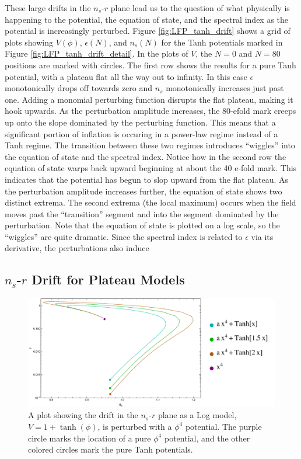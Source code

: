 \documentclass[a4paper,11pt]{article}
\def\nsr{$n_s$-$r$ }
\begin{document}
These large drifts in the \nsr plane lead us to the question of what physically is happening to the potential, the equation of state, and the spectral index as the potential is increasingly perturbed. Figure \ref{fig:LFP_tanh_drift} shows a grid of plots showing $V(\phi)$, $\epsilon(N)$, and $n_s(N)$ for the Tanh potentials marked in Figure \ref{fig:LFP_tanh_drift_detail}. In the plots of $V$, the $N=0$ and $N=80$ positions are marked with circles. The first row shows the results for a pure Tanh potential, with a plateau flat all the way out to infinity. In this case $\epsilon$ monotonically drops off towards zero and $n_s$ monotonically increases just past one. Adding a monomial perturbing function disrupts the flat plateau, making it hook upwards. As the perturbation amplitude increases, the 80-efold mark creeps up onto the slope dominated by the perturbing function. This means that a significant portion of inflation is occuring in a power-law regime instead of a Tanh regime. The transition between these two regimes introduces ``wiggles'' into the equation of state and the spectral index. Notice how in the second row the equation of state warps back upward beginning at about the 40 e-fold mark. This indicates that the potential has begun to slop upward from the flat plateau. As the perturbation amplitude increases further, the equation of state shows two distinct extrema. The second extrema (the local maximum) occurs when the field moves past the ``transition'' segment and into the segment dominated by the perturbation. Note that the equation of state is plotted on a log scale, so the ``wiggles'' are quite dramatic. Since the spectral index is related to $\epsilon$ via its derivative, the perturbations also induce 


\subsection{\nsr Drift for Plateau Models}
\label{ssec:DriftResults}

\begin{figure}[h!]
	\centering
	\includegraphics[width=\textwidth]{figures/LFP_lines_Tanh_final.pdf}
	\caption[Drift in \nsr plane for Tanh model with perturbations.]{A plot showing the drift in the \nsr plane as a Log model, $V=1+\tanh(\phi)$, is perturbed with a $\phi^4$ potential. The purple circle marks the location of a pure $\phi^4$ potential, and the other colored circles mark the pure Tanh potentials.}
	\label{fig:LFP_Tanh_drift}
\end{figure}
\end{document}
